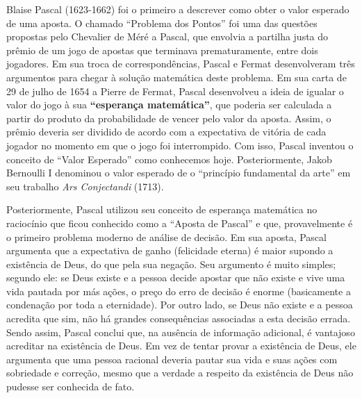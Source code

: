 \documentclass[
]{book}
\theoremstyle{definition}
\theoremstyle{definition}
\theoremstyle{definition}
\theoremstyle{remark}
\begin{document}
Blaise Pascal (1623-1662) foi o primeiro a descrever como obter o valor esperado de uma aposta. O chamado ``Problema dos Pontos'' foi uma das questões propostas pelo Chevalier de Méré a Pascal, que envolvia a partilha justa do prêmio de um jogo de apostas que terminava prematuramente, entre dois jogadores. Em sua troca de correspondências, Pascal e Fermat desenvolveram três argumentos para chegar à solução matemática deste problema. Em sua carta de 29 de julho de 1654 a Pierre de Fermat, Pascal desenvolveu a ideia de igualar o valor do jogo à sua \textbf{``esperança matemática''}, que poderia ser calculada a partir do produto da probabilidade de vencer pelo valor da aposta. Assim, o prêmio deveria ser dividido de acordo com a expectativa de vitória de cada jogador no momento em que o jogo foi interrompido. Com isso, Pascal inventou o conceito de ``Valor Esperado'' como conhecemos hoje. Posteriormente, Jakob Bernoulli I denominou o valor esperado de o ``princípio fundamental da arte'' em seu trabalho \emph{Ars Conjectandi} (1713).

Posteriormente, Pascal utilizou seu conceito de esperança matemática no raciocínio que ficou conhecido como a ``Aposta de Pascal'' e que, provavelmente é o primeiro problema moderno de análise de decisão. Em sua aposta, Pascal argumenta que a expectativa de ganho (felicidade eterna) é maior supondo a existência de Deus, do que pela sua negação. Seu argumento é muito simples; segundo ele: se Deus existe e a pessoa decide apostar que não existe e vive uma vida pautada por más ações, o preço do erro de decisão é enorme (basicamente a condenação por toda a eternidade). Por outro lado, se Deus não existe e a pessoa acredita que sim, não há grandes consequências associadas a esta decisão errada. Sendo assim, Pascal conclui que, na ausência de informação adicional, é vantajoso acreditar na existência de Deus. Em vez de tentar provar a existência de Deus, ele argumenta que uma pessoa racional deveria pautar sua vida e suas ações com sobriedade e correção, mesmo que a verdade a respeito da existência de Deus não pudesse ser conhecida de fato.
\end{document}
